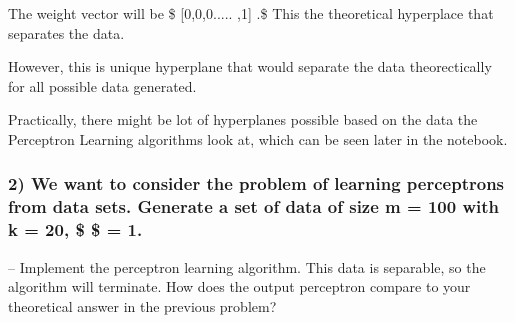 \documentclass[11pt]{article}
\begin{document}
The weight vector will be \$ {[}0,0,0..... ,1{]} .\$ This the
theoretical hyperplace that separates the data.

However, this is unique hyperplane that would separate the data
theorectically for all possible data generated.

Practically, there might be lot of hyperplanes possible based on the
data the Perceptron Learning algorithms look at, which can be seen later
in the notebook.

    \subsubsection{\texorpdfstring{2) We want to consider the problem of
learning perceptrons from data sets. Generate a set of data of size m =
100 with k = 20, \$ \epsilon \$ =
1.}{2) We want to consider the problem of learning perceptrons from data sets. Generate a set of data of size m = 100 with k = 20, \$ \$ = 1.}}\label{we-want-to-consider-the-problem-of-learning-perceptrons-from-data-sets.-generate-a-set-of-data-of-size-m-100-with-k-20-1.}

-- Implement the perceptron learning algorithm. This data is separable,
so the algorithm will terminate. How does the output perceptron compare
to your theoretical answer in the previous problem?
\end{document}
